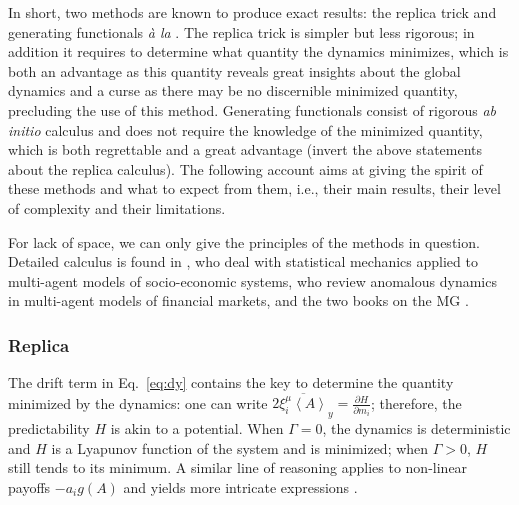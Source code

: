 \documentclass[aps,twocolumn,nofootinbib,sortedaddress,reprint]{revtex4-1}
\begin{document}
In short, two methods are known to produce exact results: the replica
trick and generating functionals {\em \`a la}
\textcite{DeDominicis}. The replica trick is simpler but less
rigorous; in addition it requires to determine what quantity the
dynamics minimizes, which is both an advantage as this quantity
reveals great insights about the global dynamics and a curse as there
may be no discernible minimized quantity, precluding the use of this
method. Generating functionals consist of rigorous {\em ab initio} calculus
and does not require the knowledge of the minimized quantity, which is
both regrettable and a great advantage (invert the above statements about the replica calculus).
The following account aims at giving the spirit of these methods
and what to expect from them, i.e., their main results, their level of
complexity and their limitations.

For lack of space, we can only give the principles of the methods in
question. Detailed calculus is found in
\textcite{demartino2006statistical}, who deal with statistical
mechanics applied to multi-agent models of socio-economic systems,
\textcite{galla2006anomalous} who review anomalous dynamics in
multi-agent models of financial markets, and the two books on the MG
\cite{MGbook,CoolenBook}.

\subsubsection{Replica}
\label{sec:replica}
The drift term in Eq.\ \eqref{eq:dy} contains the key to determine the
quantity minimized by the dynamics: one can write
$2\overline{\xi_{i}^\mu\left<A\right>}_y=\frac{\partial H}{\partial m_i}$; therefore,
the predictability $H$ is akin to a potential. When $\Gamma=0$, the
dynamics is deterministic and $H$ is a Lyapunov function of the system
and is minimized; when $\Gamma>0$, $H$ still tends to its minimum. A
similar line of reasoning applies to non-linear payoffs $-a_ig(A)$ and
yields more intricate expressions \cite{MC01}.
\end{document}
